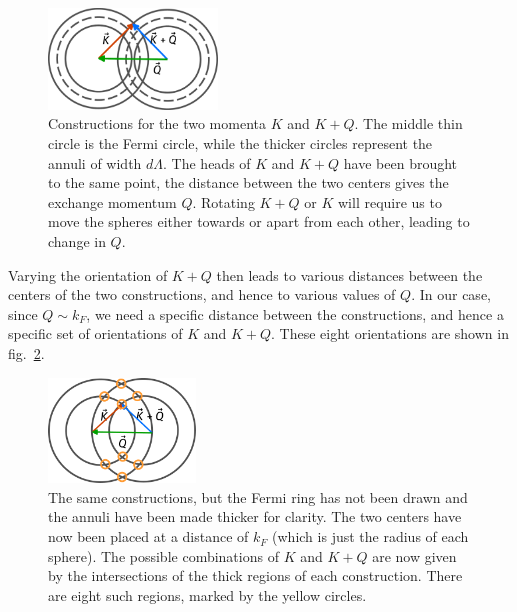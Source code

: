 \documentclass{article}
\begin{document}
\begin{figure}[!htpb]
	\centering
	\includegraphics[width=0.4\textwidth]{./figures/overlap.pdf}
	\caption{Constructions for the two momenta \(K\) and \(K+Q\). The middle thin circle is the Fermi circle, while the thicker circles represent the annuli of width \(d\Lambda\). The heads of \(K\) and \(K+Q\) have been brought to the same point, the distance between the two centers gives the exchange momentum \(Q\). Rotating \(K+Q\) or \(K\) will require us to move the spheres either towards or apart from each other, leading to change in \(Q\).}
	\label{overlap}
\end{figure}

Varying the orientation of \(K+Q\) then leads to various distances between the centers of the two constructions, and hence to various values of \(Q\). In our case, since \(Q \sim k_F\), we need a specific distance between the constructions, and hence a specific set of orientations of \(K\) and \(K+Q\). These eight orientations are shown in fig.~\ref{overlap_survive}. 

\begin{figure}[!htpb]
	\centering
	\includegraphics[width=0.35\textwidth]{./figures/overlap_survive.pdf}
	\caption{The same constructions, but the Fermi ring has not been drawn and the annuli have been made thicker for clarity.  The two centers have now been placed at a distance of \(k_F\) (which is just the radius of each sphere). The possible combinations of \(K\) and \(K+Q\) are now given by the intersections of the thick regions of each construction. There are eight such regions, marked by the yellow circles.}
	\label{overlap_survive}
\end{figure}
\end{document}
